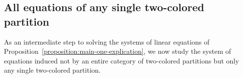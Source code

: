 \documentclass[10pt,a4paper]{amsart}
\numberwithin{equation}{section}
\newcommand{\Yc}[1]{\mathfrak{#1}}
\begin{document}
\subsection{All equations of any single two-colored partition}
\label{section:main-one-simplifications-third-simplification}
{
  \newcommand{\inlen}{k}
  \newcommand{\outlen}{\ell}
  \newcommand{\infree}{g}
  \newcommand{\outfree}{j}
  \newcommand{\incol}{\Yc{c}}
  \newcommand{\outcol}{\Yc{d}}
  \newcommand{\thepartition}{p}
  \newcommand{\somerel}{r}
  \newcommand{\sometuple}{x}
    \newcommand{\themat}{v}
  \newcommand{\thematx}[2]{v_{#1,#2}}
  \newcommand{\thetuple}{x^\themat}
  \newcommand{\altoutfree}{j'}
  \newcommand{\altinfree}{g'}
  As an intermediate step to solving the systems of linear equations of Pro\-po\-si\-tion~\ref{proposition:main-one-explication}, we now study the system of equations induced not by an entire category of two-colored partitions but only any single two-colored partition.
}
\end{document}
